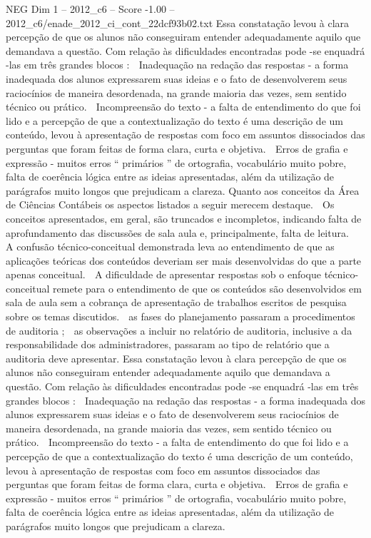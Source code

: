 \begin{textsample}{NEG Dim 1 – 2012\_c6 – Score -1.00 – 2012\_c6/enade\_2012\_ci\_cont\_22dcf93b02.txt}
Essa constatação levou à clara percepção de que os alunos não conseguiram entender adequadamente aquilo que demandava a questão.
Com relação às dificuldades encontradas pode -se enquadrá -las em três grandes blocos :  Inadequação na redação das respostas - a forma inadequada dos alunos expressarem suas ideias e o fato de desenvolverem seus raciocínios de maneira desordenada, na grande maioria das vezes, sem sentido técnico ou prático.  Incompreensão do texto - a falta de entendimento do que foi lido e a percepção de que a contextualização do texto é uma descrição de um conteúdo, levou à apresentação de respostas com foco em assuntos dissociados das perguntas que foram feitas de forma clara, curta e objetiva.  Erros de grafia e expressão - muitos erros “ primários ” de ortografia, vocabulário muito pobre, falta de coerência lógica entre as ideias apresentadas, além da utilização de parágrafos muito longos que prejudicam a clareza.
Quanto aos conceitos da Área de Ciências Contábeis os aspectos listados a seguir merecem destaque.  Os conceitos apresentados, em geral, são truncados e incompletos, indicando falta de aprofundamento das discussões de sala aula e, principalmente, falta de leitura.  A confusão técnico-conceitual demonstrada leva ao entendimento de que as aplicações teóricas dos conteúdos deveriam ser mais desenvolvidas do que a parte apenas conceitual.  A dificuldade de apresentar respostas sob o enfoque técnico-conceitual remete para o entendimento de que os conteúdos são desenvolvidos em sala de aula sem a cobrança de apresentação de trabalhos escritos de pesquisa sobre os temas discutidos.  as fases do planejamento passaram a procedimentos de auditoria ;  as observações a incluir no relatório de auditoria, inclusive a da responsabilidade dos administradores, passaram ao tipo de relatório que a auditoria deve apresentar.
Essa constatação levou à clara percepção de que os alunos não conseguiram entender adequadamente aquilo que demandava a questão.
Com relação às dificuldades encontradas pode -se enquadrá -las em três grandes blocos :  Inadequação na redação das respostas - a forma inadequada dos alunos expressarem suas ideias e o fato de desenvolverem seus raciocínios de maneira desordenada, na grande maioria das vezes, sem sentido técnico ou prático.  Incompreensão do texto - a falta de entendimento do que foi lido e a percepção de que a contextualização do texto é uma descrição de um conteúdo, levou à apresentação de respostas com foco em assuntos dissociados das perguntas que foram feitas de forma clara, curta e objetiva.  Erros de grafia e expressão - muitos erros “ primários ” de ortografia, vocabulário muito pobre, falta de coerência lógica entre as ideias apresentadas, além da utilização de parágrafos muito longos que prejudicam a clareza.

\end{textsample}
